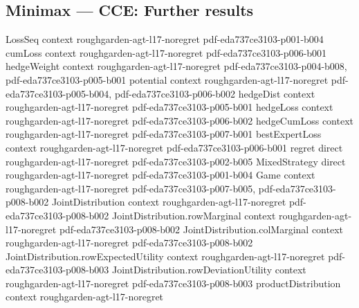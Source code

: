\subsection*{Minimax --- CCE: Further results}

\begin{lemma}
\label{empiricalJoint_row_deviation_le}
\leanok
{}
\proofstep
  {LossSeq}
  {context}
  {roughgarden-agt-l17-noregret}
  {pdf-eda737ce3103-p001-b004}
\proofstep
  {cumLoss}
  {context}
  {roughgarden-agt-l17-noregret}
  {pdf-eda737ce3103-p006-b001}
\proofstep
  {hedgeWeight}
  {context}
  {roughgarden-agt-l17-noregret}
  {pdf-eda737ce3103-p004-b008,
    pdf-eda737ce3103-p005-b001}
\proofstep
  {potential}
  {context}
  {roughgarden-agt-l17-noregret}
  {pdf-eda737ce3103-p005-b004,
    pdf-eda737ce3103-p006-b002}
\proofstep
  {hedgeDist}
  {context}
  {roughgarden-agt-l17-noregret}
  {pdf-eda737ce3103-p005-b001}
\proofstep
  {hedgeLoss}
  {context}
  {roughgarden-agt-l17-noregret}
  {pdf-eda737ce3103-p006-b002}
\proofstep
  {hedgeCumLoss}
  {context}
  {roughgarden-agt-l17-noregret}
  {pdf-eda737ce3103-p007-b001}
\proofstep
  {bestExpertLoss}
  {context}
  {roughgarden-agt-l17-noregret}
  {pdf-eda737ce3103-p006-b001}
\proofstep
  {regret}
  {direct}
  {roughgarden-agt-l17-noregret}
  {pdf-eda737ce3103-p002-b005}
\proofstep
  {MixedStrategy}
  {direct}
  {roughgarden-agt-l17-noregret}
  {pdf-eda737ce3103-p001-b004}
\proofstep
  {Game}
  {context}
  {roughgarden-agt-l17-noregret}
  {pdf-eda737ce3103-p007-b005,
    pdf-eda737ce3103-p008-b002}
\proofstep
  {JointDistribution}
  {context}
  {roughgarden-agt-l17-noregret}
  {pdf-eda737ce3103-p008-b002}
\proofstep
  {JointDistribution.rowMarginal}
  {context}
  {roughgarden-agt-l17-noregret}
  {pdf-eda737ce3103-p008-b002}
\proofstep
  {JointDistribution.colMarginal}
  {context}
  {roughgarden-agt-l17-noregret}
  {pdf-eda737ce3103-p008-b002}
\proofstep
  {JointDistribution.rowExpectedUtility}
  {context}
  {roughgarden-agt-l17-noregret}
  {pdf-eda737ce3103-p008-b003}
\proofstep
  {JointDistribution.rowDeviationUtility}
  {context}
  {roughgarden-agt-l17-noregret}
  {pdf-eda737ce3103-p008-b003}
\proofstep
  {productDistribution}
  {context}
  {roughgarden-agt-l17-noregret}

\end{lemma}
